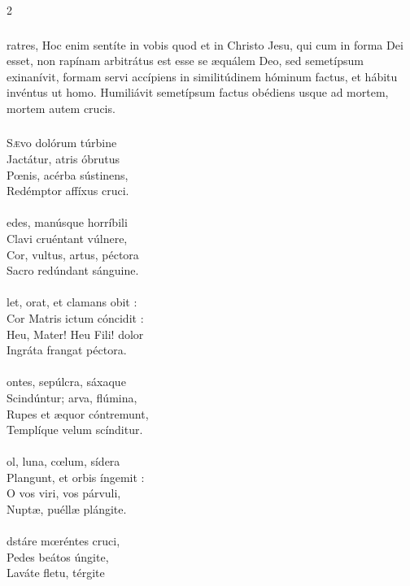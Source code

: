 \documentclass[9pt,twoside]{extarticle}
\begin{document}
\begin{multicols}{2}
{{\subsubsection*{}
ratres, Hoc enim sentíte in vobis quod et in Christo Jesu, qui cum in forma Dei esset, non rapínam arbitrátus est esse se æquálem Deo, sed semetípsum exinanívit, formam servi accípiens in similitúdinem hóminum factus, et hábitu invéntus ut homo. Humiliávit semetípsum factus obédiens usque ad mortem, mortem autem crucis.

\subsubsection*{\center {}}
\lettrine{S}ævo dolórum túrbine\\
Jactátur, atris óbrutus\\
Pœnis, acérba sústinens,\\
Redémptor affíxus cruci.\\
\\
edes, manúsque horríbili\\
Clavi cruéntant vúlnere,\\
Cor, vultus, artus, péctora\\
Sacro redúndant sánguine.\\
\\
let, orat, et clamans obit :\\
Cor Matris ictum cóncidit :\\
Heu, Mater! Heu Fili! dolor\\
Ingráta frangat péctora.\\
\\
ontes, sepúlcra, sáxaque\\
Scindúntur; arva, flúmina,\\
Rupes et æquor cóntremunt,\\
Templíque velum scínditur.\\
\\
ol, luna, cœlum, sídera\\
Plangunt, et orbis íngemit :\\
O vos viri, vos párvuli,\\
Nuptæ, puéllæ plángite.\\
\\
dstáre mœréntes cruci,\\
Pedes beátos úngite,\\
Laváte fletu, térgite\\
}}
\end{multicols}
\end{document}

